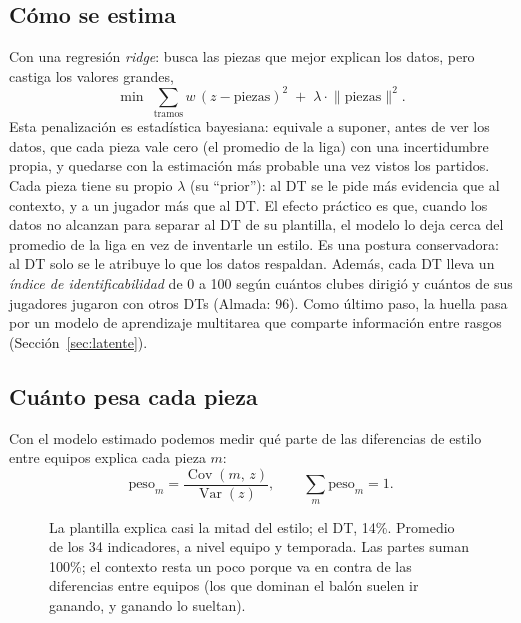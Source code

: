 \documentclass[10pt,a4paper,twocolumn]{article}
\begin{document}
\subsection{Cómo se estima}
Con una regresión \emph{ridge}: busca las piezas que mejor explican los datos, pero castiga los valores grandes,
\begin{equation}
\min \; \sum_{\text{tramos}} w\,(z - \text{piezas})^2 \;+\; \lambda \cdot \lVert\text{piezas}\rVert^2 .
\end{equation}
Esta penalización es estadística bayesiana: equivale a suponer, antes de ver los datos, que cada pieza vale cero (el promedio de la liga) con una incertidumbre propia, y quedarse con la estimación más probable una vez vistos los partidos. Cada pieza tiene su propio $\lambda$ (su ``prior''): al DT se le pide más evidencia que al contexto, y a un jugador más que al DT. El efecto práctico es que, cuando los datos no alcanzan para separar al DT de su plantilla, el modelo lo deja cerca del promedio de la liga en vez de inventarle un estilo. Es una postura conservadora: al DT solo se le atribuye lo que los datos respaldan. Además, cada DT lleva un \emph{índice de identificabilidad} de 0 a 100 según cuántos clubes dirigió y cuántos de sus jugadores jugaron con otros DTs (Almada: 96). Como último paso, la huella pasa por un modelo de aprendizaje multitarea que comparte información entre rasgos (Sección~\ref{sec:latente}).

\subsection{Cuánto pesa cada pieza}
Con el modelo estimado podemos medir qué parte de las diferencias de estilo entre equipos explica cada pieza $m$:
\begin{equation}
\text{peso}_m = \frac{\operatorname{Cov}(m,\, z)}{\operatorname{Var}(z)}, \qquad \textstyle\sum_m \text{peso}_m = 1 .
\end{equation}

\begin{figure}[H]
\centering
{}
\caption{La plantilla explica casi la mitad del estilo; el DT, 14\%. Promedio de los 34 indicadores, a nivel equipo y temporada. Las partes suman 100\%; el contexto resta un poco porque va en contra de las diferencias entre equipos (los que dominan el balón suelen ir ganando, y ganando lo sueltan).}
\label{fig:varianza}
\end{figure}
\end{document}
